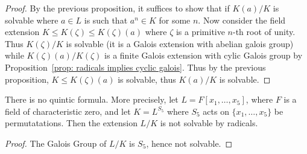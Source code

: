 \documentclass[twoside, a4paper, 10pt]{amsart}
\begin{document}
\begin{proof} By the previous proposition, it suffices to show that if $K(a)/K$ is solvable where $a \in L$ is such that $a^n \in K$ for some $n$. Now consider the field extension $K \leq K(\zeta) \leq K(\zeta)(a)$ where $\zeta$ is a primitive $n$-th root of unity. Thus $K(\zeta)/K$ is solvable (it is a Galois extension with abelian galois group) while $K(\zeta)(a)/K(\zeta)$ is a finite Galois extension with cylic Galois group by Proposition~\ref{prop: radicals implies cyclic galois}. Thus by the previous proposition, $K \leq K(\zeta)(a)$ is solvable, thus $K(a)/K$ is solvable.

\end{proof}

\begin{thm} There is no quintic formula. More precisely, let $L = F[x_1, \ldots, x_5]$, where $F$ is a field of characteristic zero, and let $K = L^{S_5}$ where $S_5$ acts on $\{x_1, \ldots, x_5\}$ be permutatations. Then the extension $L/K$ is not solvable by radicals.

\end{thm}

\begin{proof} The Galois Group of $L/K$ is $S_5$, hence not solvable.\end{proof}
\end{document}

